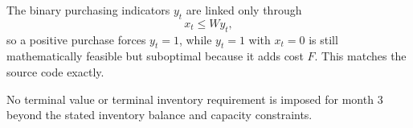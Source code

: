 The binary purchasing indicators \(y_t\) are linked only through
\[
x_t \le W y_t,
\]
so a positive purchase forces \(y_t=1\), while \(y_t=1\) with \(x_t=0\) is still mathematically feasible but suboptimal because it adds cost \(F\). This matches the source code exactly.

No terminal value or terminal inventory requirement is imposed for month 3 beyond the stated inventory balance and capacity constraints.
